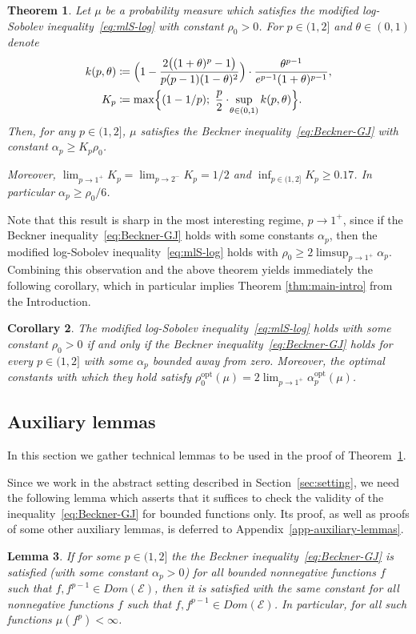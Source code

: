 \documentclass[a4paper]{amsart}
\newtheorem{theorem}{Theorem}[section]
\newtheorem{lemma}[theorem]{Lemma}
\newtheorem{corollary}[theorem]{Corollary} %
\theoremstyle{definition}
\theoremstyle{remark}
\numberwithin{equation}{section}
\newcommand*{\opt}{\text{opt}}
\newcommand*{\calE}{\mathcal{E}}
\begin{document}
\begin{theorem}\label{thm:main:mLS_to_Bec}
 Let $\mu$ be a probability measure which satisfies the modified log-Sobolev inequality~\eqref{eq:mlS-log} with constant $\rho_0>0$.
 For  $p\in(1,2]$ and $\theta\in(0,1)$ denote
 \begin{align*}
  k(p,\theta) &\coloneqq \Bigl(1 - \frac{2\bigl((1+ \theta)^{p}-1 \bigr)}{p(p-1)(1-\theta)^2} \Bigr)
  \cdot		\frac{\theta^{p-1}}{e^{p-1}(1+\theta)^{p-1}},\\
  K_p &\coloneqq
  \max\Bigl\{
  	(1-1/p);\
  	\frac{p}{2}\cdot\!\sup_{\theta\in(0,1)} k(p,\theta) \Bigr\}.  		
 \end{align*}
  Then, for  any $p\in (1,2]$, $\mu$ satisfies the Beckner inequality~\eqref{eq:Beckner-GJ}  with constant $\alpha_p \ge K_p \rho_0$.

 Moreover, $\lim_{p\to 1^+} K_p = \lim_{p\to 2^-} K_p = 1/2$ and $\inf_{p\in(1,2]} K_p \geq 0.17$. In particular $\alpha_p \ge \rho_0/6$.
\end{theorem}

Note that this result is sharp in the most interesting regime, $p\to 1^+$, since if the Beckner inequality~\eqref{eq:Beckner-GJ} holds with some  constants $\alpha_p$, then the modified log-Sobolev inequality~\eqref{eq:mlS-log} holds with $\rho_0 \ge 2 \limsup_{p\to 1^+} \alpha_p$.
Combining this observation and the above theorem yields immediately the following corollary, which in particular implies Theorem \ref{thm:main-intro} from the Introduction.

\begin{corollary}
\label{cor:constants_in_main_thm}
The modified log-Sobolev inequality~\eqref{eq:mlS-log} holds with some constant $\rho_0>0$ if and only if the Beckner inequality~\eqref{eq:Beckner-GJ} holds for every $p\in(1,2]$ with some $\alpha_p$ bounded away from zero.
Moreover,  the optimal constants with which they  hold satisfy $\rho_0^\opt(\mu) = 2\lim_{p\to 1^+}\alpha_p^\opt(\mu)$.
\end{corollary}

\subsection{Auxiliary lemmas}
In this section we gather technical lemmas to be used in the proof of Theorem~\ref{thm:main:mLS_to_Bec}.

Since we work in the abstract setting described in Section~\ref{sec:setting}, we need the following lemma which asserts that it suffices to check the validity of the inequality~\eqref{eq:Beckner-GJ} for bounded functions only. Its proof, as well as proofs of some other auxiliary lemmas, is deferred to Appendix~\ref{app-auxiliary-lemmas}.
\begin{lemma}\label{L:Bec=>finite-mean}
	If for some $p\in(1,2]$ the the Beckner inequality~\eqref{eq:Beckner-GJ} is satisfied (with some constant $\alpha_p>0$) for all bounded nonnegative functions $f$ such that $f,f^{p-1}\in Dom(\calE)$, then it is satisfied with the same constant for all nonnegative functions $f$ such that $f,f^{p-1}\in Dom(\calE)$.
	In particular, for all such functions $\mu(f^p)<\infty$.
\end{lemma}
\end{document}
